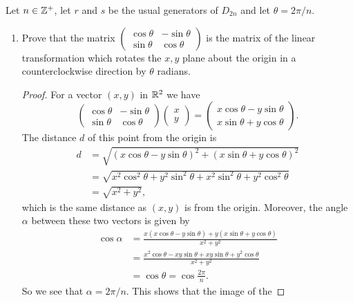  Let $n\in\mathbb{Z}^+$, let $r$ and $s$ be the usual generators
of $D_{2n}$ and let $\theta = 2\pi/n$.
\begin{enumerate}
\item Prove that the matrix
  $\begin{pmatrix} \cos\theta & -\sin\theta \\ \sin\theta &
    \cos\theta \end{pmatrix}$ is the matrix of the linear
  transformation which rotates the $x,y$ plane about the origin in a
  counterclockwise direction by $\theta$ radians.
  \begin{proof}
    For a vector $(x,y)$ in $\mathbb{R}^2$ we have
    \begin{equation*}
      \begin{pmatrix}
        \cos\theta & -\sin\theta \\
        \sin\theta & \cos\theta
      \end{pmatrix}
      \begin{pmatrix}
        x \\
        y
      \end{pmatrix}
      =
      \begin{pmatrix}
        x\cos\theta - y\sin\theta \\
        x\sin\theta + y\cos\theta
      \end{pmatrix}.
    \end{equation*}
    The distance $d$ of this point from the origin is
    \begin{align*}
      d &= \sqrt{(x\cos\theta - y\sin\theta)^2
          + (x\sin\theta + y\cos\theta)^2} \\
        &= \sqrt{x^2\cos^2\theta + y^2\sin^2\theta
          + x^2\sin^2\theta + y^2\cos^2\theta} \\
        &= \sqrt{x^2 + y^2},
    \end{align*}
    which is the same distance as $(x,y)$ is from the
    origin. Moreover, the angle $\alpha$ between these two vectors is
    given by
    \begin{align*}
      \cos\alpha
      &= \frac{x(x\cos\theta - y\sin\theta)
        + y(x\sin\theta + y\cos\theta)}
      {x^2 + y^2} \\
      &= \frac{x^2\cos\theta - xy\sin\theta + xy\sin\theta + y^2\cos\theta}
        {x^2 + y^2} \\
      &= \cos\theta = \cos\frac{2\pi}n.
    \end{align*}
    So we see that $\alpha = 2\pi/n$. This shows that the image of the

\end{proof}
\end{enumerate}
